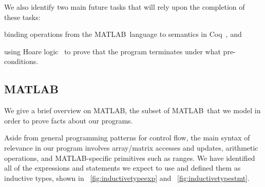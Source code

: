 \documentclass[11pt,conference]{IEEEtran}
\newcommand{\matlab}{MATLAB}
\newcommand{\mmatlab}{\textmu\matlab}
\begin{document}
We also identify two main future tasks that will rely upon the completion of
these tasks:
\begin{inlist}
\item binding operations from the \mmatlab\ language to semantics in
    Coq~\cite{Coq}, and
\item using Hoare logic~\cite{Hoare_1969} to prove that the program terminates
    under what pre-conditions.
\end{inlist}

\subsection{\mmatlab}\label{S:mmatlab}

We give a brief overview on \mmatlab, the subset of \matlab\ that we model in
order to prove facts about our programs.

Aside from general programming patterns for control flow, the main syntax of
relevance in our program involves array/matrix accesses and updates, arithmetic
operations, and \matlab-specific primitives such as ranges. We have identified
all of the expressions and statements we expect to use and defined them as
inductive types, shown in \figurename~\ref{fig:inductivetypeexp} and
\figurename~\ref{fig:inductivetypestmt}.
\end{document}
